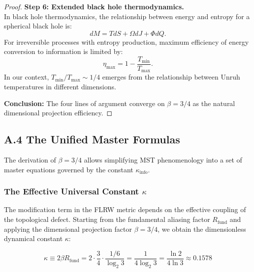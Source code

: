 \documentclass[11pt, a4paper]{article}
\theoremstyle{plain}
\theoremstyle{definition}
\begin{document}
\begin{proof}
\textbf{Step 6: Extended black hole thermodynamics.} \\
In black hole thermodynamics, the relationship between energy and entropy for a spherical black hole is:
\begin{equation}
dM = T dS + \Omega dJ + \Phi dQ.
\end{equation}
For irreversible processes with entropy production, maximum efficiency of energy conversion to information is limited by:
\begin{equation}
\eta_{\text{max}} = 1 - \frac{T_{\text{min}}}{T_{\text{max}}}.
\end{equation}
In our context, $T_{\text{min}}/T_{\text{max}} \sim 1/4$ emerges from the relationship between Unruh temperatures in different dimensions.

\textbf{Conclusion:} The four lines of argument converge on $\beta = 3/4$ as the natural dimensional projection efficiency.
\end{proof}


\subsection{A.4 The Unified Master Formulas}
\label{app:master_formulas}

The derivation of $\beta = 3/4$ allows simplifying MST phenomenology into a set of master equations governed by the constant $\kappa_{\text{info}}$.

\subsubsection{The Effective Universal Constant \texorpdfstring{$\kappa$}{kappa}}
The modification term in the FLRW metric depends on the effective coupling of the topological defect. Starting from the fundamental aliasing factor $R_{\text{fund}}$ and applying the dimensional projection factor $\beta=3/4$, we obtain the dimensionless dynamical constant $\kappa$:

\begin{equation}
\kappa \equiv 2\beta R_{\text{fund}} = 2 \cdot \frac{3}{4} \cdot \frac{1/6}{\log_2 3} = \frac{1}{4 \log_2 3} = \frac{\ln 2}{4 \ln 3} \approx 0.1578
\end{equation}
\end{document}
